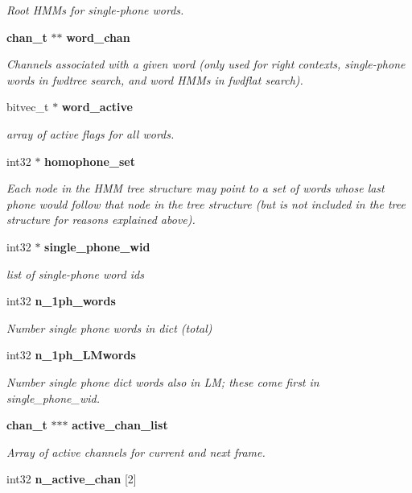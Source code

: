 \begin{DoxyCompactItemize}
\begin{DoxyCompactList}\small\item\em Root H\+M\+Ms for single-\/phone words. \end{DoxyCompactList}\item 
{\bf chan\+\_\+t} $\ast$$\ast$ {\bf word\+\_\+chan}
\begin{DoxyCompactList}\small\item\em Channels associated with a given word (only used for right contexts, single-\/phone words in fwdtree search, and word H\+M\+Ms in fwdflat search). \end{DoxyCompactList}\item 
bitvec\+\_\+t $\ast$ {\bf word\+\_\+active}
\begin{DoxyCompactList}\small\item\em array of active flags for all words. \end{DoxyCompactList}\item 
int32 $\ast$ {\bf homophone\+\_\+set}
\begin{DoxyCompactList}\small\item\em Each node in the H\+M\+M tree structure may point to a set of words whose last phone would follow that node in the tree structure (but is not included in the tree structure for reasons explained above). \end{DoxyCompactList}\item 
int32 $\ast$ {\bf single\+\_\+phone\+\_\+wid}\label{structngram__search__s_a1157923e0060b947e05caa819c8abe2c}

\begin{DoxyCompactList}\small\item\em list of single-\/phone word ids \end{DoxyCompactList}\item 
int32 {\bf n\+\_\+1ph\+\_\+words}\label{structngram__search__s_a9168184c862d6f63bd7926e6581b25d9}

\begin{DoxyCompactList}\small\item\em Number single phone words in dict (total) \end{DoxyCompactList}\item 
int32 {\bf n\+\_\+1ph\+\_\+\+L\+Mwords}\label{structngram__search__s_a988672d895f1ee61dbf790b2065df4df}

\begin{DoxyCompactList}\small\item\em Number single phone dict words also in L\+M; these come first in single\+\_\+phone\+\_\+wid. \end{DoxyCompactList}\item 
{\bf chan\+\_\+t} $\ast$$\ast$$\ast$ {\bf active\+\_\+chan\+\_\+list}
\begin{DoxyCompactList}\small\item\em Array of active channels for current and next frame. \end{DoxyCompactList}\item 
int32 {\bf n\+\_\+active\+\_\+chan} [2]\label{structngram__search__s_ac33f60894871671ec5c2173ca56d600f}


\end{DoxyCompactItemize}
